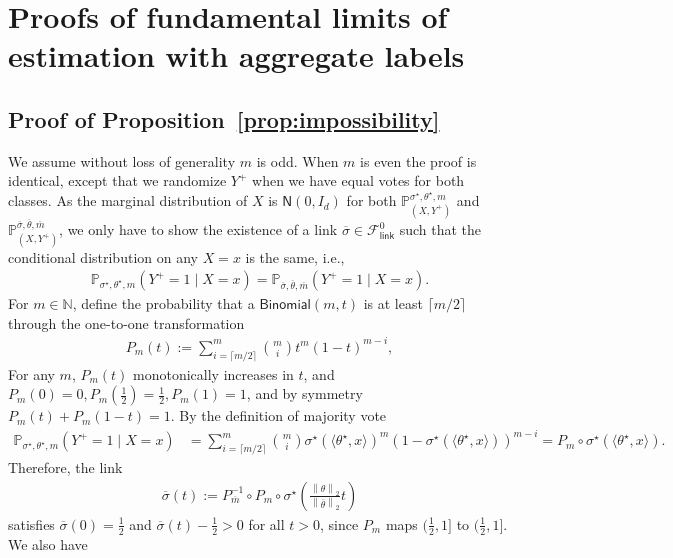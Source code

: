 \documentclass[11pt]{article}
\newcommand{\Prb}{\mathbb{P}}
\renewcommand{\P}{\mathbb{P}}
\newcommand{\norm}[1]{\left\|{#1}\right\|} %
\newcommand{\wb}[1]{\overline{#1}}
\newcommand{\majY}{Y^+}
\newcommand{\normal}{\mathsf{N}}
\newcommand{\bindist}{\mathsf{Binomial}}
\newcommand{\fsymlink}{\mathcal{F}_{\mathsf{link}}^0}
\newcommand{\ltwo}[1]{\norm{#1}_2} %
\newcommand{\<}{\langle} %
\renewcommand{\>}{\rangle}
\newcommand{\opt}{^\star}
\begin{document}
\section{Proofs of fundamental limits of estimation with aggregate labels} 

\subsection{Proof of Proposition~\ref{prop:impossibility}} \label{proof:impossibility}
We assume without loss of generality $m$ is odd. When $m$ is even the proof
is identical, except that we randomize $\majY$ when we have equal votes for
both classes. As the marginal distribution of $X$ is $\normal(0, I_d)$ for
both $\P_{(X,\majY)}^{\sigma\opt, \theta\opt, m}$ and
$\P_{(X,\majY)}^{\wb{\sigma}, \wb{\theta}, \wb{m}}$, we only have to show
the existence of a link $\wb{\sigma} \in \fsymlink$ such that the
conditional distribution on any $X=x$ is the same, i.e.,
\begin{align*}
  \Prb_{\sigma\opt, \theta\opt, m} (\majY = 1 \mid X=x) =
  \Prb_{\wb{\sigma}, \wb{\theta}, \wb{m}}(\majY = 1 \mid X=x) .
\end{align*}
For $m \in \mathbb{N}$, define the probability that a $\bindist(m, t)$ is at
least $\lceil m / 2 \rceil$ through the one-to-one transformation
\begin{align*}
  P_m(t) := \sum_{i=\lceil m/2 \rceil}^m \binom{m}{i} t^m(1-t)^{m-i}   ,
\end{align*}
 For any $m$, $P_m(t)$ monotonically increases in $t$, and $P_m(0)= 0, P_m(\frac{1}{2}) = \frac{1}{2}, P_m(1) = 1$, and by symmetry $P_m(t) + P_m(1-t) = 1$. By the definition of majority vote
\begin{align*}
	\Prb_{\sigma\opt, \theta\opt, m} (\majY = 1 \mid X=x) & = \sum_{i=\lceil m/2 \rceil}^m \binom{m}{i} \sigma\opt(\< \theta\opt, x \>)^m(1-\sigma\opt(\< \theta\opt, x \>))^{m-i} = P_m \circ \sigma\opt(\< \theta\opt, x \>).
\end{align*}
Therefore, the link
\begin{align*}
	\wb{\sigma}(t) := P_{\wb{m}}^{-1} \circ P_{m} \circ \sigma\opt \left(\frac{\ltwo{\theta}}{\ltwo{\wb{\theta}}} t \right)
\end{align*}
satisfies $\wb{\sigma}(0) = \frac{1}{2}$ and $\wb{\sigma}(t) - \frac{1}{2} > 0$ for all $t > 0$, since $P_m$ maps $(\frac 1 2, 1]$ to $(\frac 1 2 , 1]$. We also have
\end{document}
